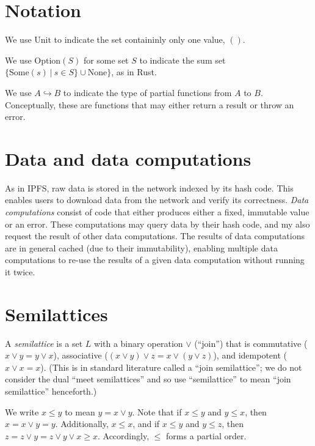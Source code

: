\documentclass{article}
\begin{document}
  \section{Notation}

    We use $\mathrm{Unit}$ to indicate the set containinly only one value, $()$.

    We use $\mathrm{Option}(S)$ for some set $S$ to indicate the sum set $\{ \mathrm{Some}(s) ~ | ~ s \in S \} \cup \mathrm{None}\}$, as in Rust.

    \newcommand{\partialto}{\hookrightarrow}

    We use $A \partialto B$ to indicate the type of partial functions from $A$ to $B$. Conceptually, these are functions that may either return a result or throw an error.

  \section{Data and data computations}

    As in IPFS, raw data is stored in the network indexed by its hash code. This enables users to download data from the network and verify its correctness. \emph{Data computations} consist of code that either produces either a fixed, immutable value or an error. These computations may query data by their hash code, and my also request the result of other data computations. The results of data computations are in general cached (due to their immutability), enabling multiple data computations to re-use the results of a given data computation without running it twice.

  \section{Semilattices}

    A \emph{semilattice} is a set $L$ with a binary operation $\vee$ (``join'') that is commutative ($x \vee y = y \vee x$), associative ($(x \vee y) \vee z = x \vee (y \vee z)$), and idempotent ($x \vee x = x$). (This is in standard literature called a ``join semilattice''; we do not consider the dual ``meet semilattices'' and so use ``semilattice'' to mean ``join semilattice'' henceforth.)

    We write $x \leq y$ to mean $y = x \vee y$. Note that if $x \leq y$ and $y \leq x$, then $x = x \vee y = y$. Additionally, $x \leq x$, and if $x \leq y$ and $y \leq z$, then $z = z \vee y = z \vee y \vee x \geq x$. Accordingly, $\leq$ forms a partial order.
\end{document}
